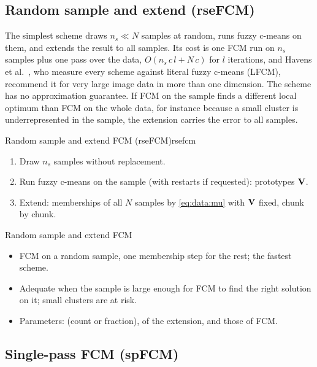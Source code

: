 \subsection{Random sample and extend (rseFCM)}\label{sec:data:rse}

The simplest scheme draws $n_s\ll N$ samples at random, runs fuzzy c-means on them, and extends the result to all samples. Its cost is one FCM run on $n_s$ samples plus one pass over the data, $O(n_s\,c\,l+N\,c)$ for $l$ iterations, and Havens et al.\ \cite{havens:2012:large}, who measure every scheme against literal fuzzy c-means (LFCM), recommend it for very large image data in more than one dimension. The scheme has no approximation guarantee. If FCM on the sample finds a different local optimum than FCM on the whole data, for instance because a small cluster is underrepresented in the sample, the extension carries the error to all samples.

\begin{algobox}{Random sample and extend FCM (rseFCM)}{rsefcm}
\begin{enumerate}[leftmargin=*]
  \item Draw $n_s$ samples without replacement.
  \item Run fuzzy c-means on the sample (with restarts if requested): prototypes $\mathbf{V}$.
  \item Extend: memberships of all $N$ samples by \eqref{eq:data:mu} with $\mathbf{V}$ fixed, chunk by chunk.
\end{enumerate}
\end{algobox}
\begin{summarybox}{Random sample and extend FCM}
\begin{itemize}
  \item FCM on a random sample, one membership step for the rest; the fastest scheme.
  \item Adequate when the sample is large enough for FCM to find the right solution on it; small clusters are at risk.
  \item Parameters:  (count or fraction),  of the extension, and those of FCM.
\end{itemize}
\end{summarybox}

\subsection{Single-pass FCM (spFCM)}\label{sec:data:sp}

